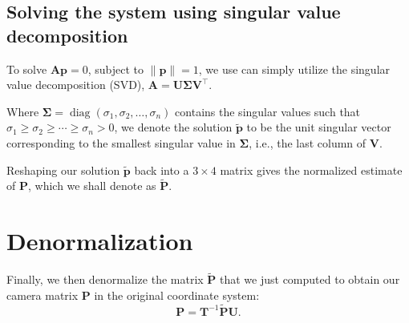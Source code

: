 \documentclass[12pt]{article}
\begin{document}
\subsection{Solving the system using singular value decomposition}

To solve $ \mathbf{A} \mathbf{p} = 0 $, subject to $ \| \mathbf{p} \| = 1 $, we use can simply utilize the singular value decomposition (SVD), $\mathbf{A} = \mathbf{U} \mathbf{\Sigma} \mathbf{V}^\top$.

Where $\mathbf{\Sigma}=\operatorname{diag}(\sigma_1, \sigma_2, \ldots, \sigma_n)$ contains the singular values such that $\sigma_1 \ge \sigma_2 \ge \cdots \ge \sigma_n > 0$, we denote the solution $ \tilde{\mathbf{p}} $ to be the unit singular vector corresponding to the smallest singular value in $ \mathbf{\Sigma} $, i.e., the last column of $ \mathbf{V}$.

Reshaping our solution $\tilde{\mathbf{p}}$ back into a $3 \times 4$ matrix gives the normalized estimate of $\mathbf{P}$, which we shall denote as $\tilde{\mathbf{P}}$.

\section{Denormalization}

Finally, we then denormalize the matrix $\tilde{\mathbf{P}}$ that we just computed to obtain our camera matrix $ \mathbf{P} $ in the original coordinate system:
$$
\mathbf{P} = \mathbf{T}^{-1} \tilde{\mathbf{P}} \mathbf{U}.
$$
\end{document}
